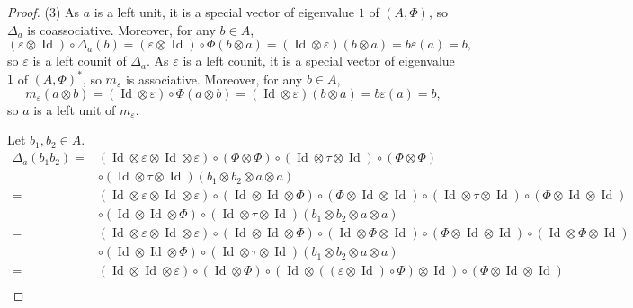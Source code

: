 \documentclass[10pt,a4paper]{amsart}
\numberwithin{equation}{section}
\begin{document}
\begin{proof}
(3) As $a$ is a left unit, it is a special vector of eigenvalue $1$ of $(A,\Phi)$, so $\Delta_a$ is coassociative. Moreover, for any $b\in A$,
\[(\varepsilon\otimes \operatorname{Id})\circ \Delta_a(b)=(\varepsilon\otimes \operatorname{Id})\circ \Phi(b\otimes a)=(\operatorname{Id} \otimes \varepsilon)(b\otimes a)=b\varepsilon(a)=b,\]
so $\varepsilon$ is a left counit of $\Delta_a$. As $\varepsilon$ is a left counit, it is a special vector of eigenvalue $1$ of $(A,\Phi)^*$, so $m_\varepsilon$ is associative. Moreover, for any $b\in A$,{\samepage
\[m_\varepsilon(a\otimes b)=(\operatorname{Id} \otimes \varepsilon)\circ \Phi(a\otimes b)=(\operatorname{Id} \otimes \varepsilon)(b\otimes a)=b\varepsilon(a)=b,\]
so $a$ is a left unit of $m_\varepsilon$.}

Let $b_1,b_2\in A$.
\begin{align*}
\Delta_a(b_1b_2)={}&(\operatorname{Id} \otimes \varepsilon\otimes \operatorname{Id} \otimes \varepsilon)\circ (\Phi\otimes \Phi)\circ (\operatorname{Id} \otimes \tau\otimes \operatorname{Id})\circ (\Phi\otimes \Phi)\\
&\circ (\operatorname{Id} \otimes \tau\otimes \operatorname{Id})(b_1\otimes b_2\otimes a\otimes a)\\
={}&(\operatorname{Id} \otimes \varepsilon\otimes \operatorname{Id} \otimes \varepsilon)\circ (\operatorname{Id} \otimes \operatorname{Id} \otimes \Phi)\circ (\Phi\otimes \operatorname{Id} \otimes \operatorname{Id})\circ (\operatorname{Id} \otimes \tau\otimes \operatorname{Id})\circ (\Phi\otimes \operatorname{Id} \otimes \operatorname{Id})\\
&\circ(\operatorname{Id} \otimes \operatorname{Id} \otimes \Phi)\circ (\operatorname{Id} \otimes \tau\otimes \operatorname{Id})(b_1\otimes b_2\otimes a\otimes a)\\
={}&(\operatorname{Id} \otimes \varepsilon\otimes \operatorname{Id} \otimes \varepsilon)\circ (\operatorname{Id} \otimes \operatorname{Id} \otimes \Phi)\circ (\operatorname{Id}\otimes \Phi \otimes \operatorname{Id})\circ (\Phi \otimes \operatorname{Id}\otimes \operatorname{Id})\circ (\operatorname{Id}\otimes \Phi\otimes \operatorname{Id})\\
&\circ(\operatorname{Id} \otimes \operatorname{Id} \otimes \Phi)\circ (\operatorname{Id} \otimes \tau\otimes \operatorname{Id})(b_1\otimes b_2\otimes a\otimes a)\\
={}&(\operatorname{Id} \otimes \operatorname{Id} \otimes \varepsilon)\circ (\operatorname{Id} \otimes \Phi)\circ (\operatorname{Id}\otimes ((\varepsilon \otimes \operatorname{Id})\circ\Phi) \otimes \operatorname{Id})\circ (\Phi \otimes \operatorname{Id}\otimes \operatorname{Id})\\

\end{align*}
\end{proof}
\end{document}
